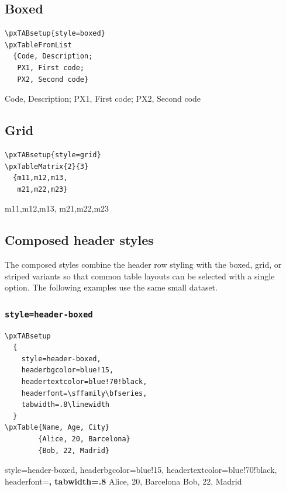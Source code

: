 \documentclass[11pt,a4paper]{article}
\begin{document}
\subsection{Boxed}

\begin{verbatim}
\pxTABsetup{style=boxed}
\pxTableFromList
  {Code, Description;
   PX1, First code;
   PX2, Second code}
\end{verbatim}

\pxTableFromList
  {Code, Description;
   PX1, First code;
   PX2, Second code}

\subsection{Grid}

\begin{verbatim}
\pxTABsetup{style=grid}
\pxTableMatrix{2}{3}
  {m11,m12,m13,
   m21,m22,m23}
\end{verbatim}

  {m11,m12,m13,
   m21,m22,m23}

\subsection{Composed header styles}

The composed styles combine the header row styling with the boxed,
grid, or striped variants so that common table layouts can be selected
with a single option.  The following examples use the same small
dataset.

\subsubsection*{\texttt{style=header-boxed}}

\begin{verbatim}
\pxTABsetup
  {
    style=header-boxed,
    headerbgcolor=blue!15,
    headertextcolor=blue!70!black,
    headerfont=\sffamily\bfseries,
    tabwidth=.8\linewidth
  }
\pxTable{Name, Age, City}
        {Alice, 20, Barcelona}
        {Bob, 22, Madrid}
\end{verbatim}

\pxTABsetup
  {
    style=header-boxed,
    headerbgcolor=blue!15,
    headertextcolor=blue!70!black,
    headerfont=\sffamily\bfseries,
    tabwidth=.8\linewidth
  }
        {Alice, 20, Barcelona}
        {Bob, 22, Madrid}
\end{document}
